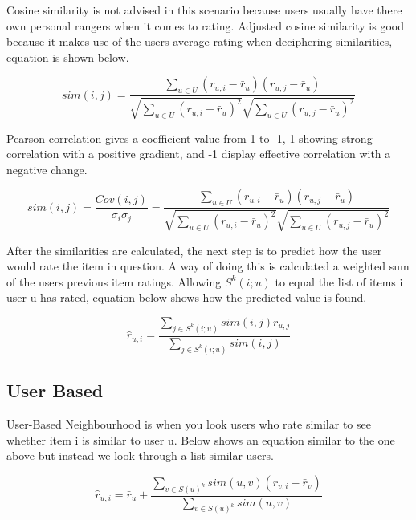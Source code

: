 Cosine similarity is not advised in this scenario because users usually have there own personal rangers when it comes to rating. Adjusted cosine similarity is good because it makes use of the users average rating when deciphering similarities, equation is shown below.

\begin{equation}
	sim(i , j) = \frac{ \sum_{ u \in U } ( r _{ u, i } - \bar{r} _{u} ) ( r _{ u, j} - \bar{r} _{u} ) } { \sqrt{\sum_{ u \in U } ( r _{ u, i } - \bar{r} _{u} )^2} \sqrt{\sum_{ u \in U } ( r _{ u, j } - \bar{r} _{u} )^2}}
\end{equation}

Pearson correlation gives a coefficient value from 1 to -1, 1 showing strong correlation with a positive gradient, and -1 display effective correlation with a negative change.

\begin{equation}
	sim(i , j) = \frac{ Cov( i, j) }{ \sigma _{i} \sigma _{j} } = \frac{ \sum _{ u \in U} ( r _{ u, i } - \bar{r} _{u} ) ( r _{ u, j} - \bar{r} _{u} ) } { \sqrt{\sum_{ u \in U } ( r _{ u, i } - \bar{r} _{u} )^2} \sqrt{\sum_{ u \in U } ( r _{ u, j } - \bar{r} _{u} )^2}}
\end{equation}

After the similarities are calculated, the next step is to predict how the user would rate the item in question. A way of doing this is calculated a weighted sum of the users previous item ratings. Allowing $ S^{k}(i;u)$ to equal the list of items i user u has rated, equation below shows how the predicted value is found.

\begin{equation}
	\hat{r} _{u,i} = \frac{ \sum _{ j \in S^{k}(i;u)} sim(i , j) r _{u, j}}{\sum _{j \in S^{k}(i;u)} sim(i , j)}
\end{equation}




\subsection{User Based}

User-Based Neighbourhood is when you look users who rate similar to see whether item i is similar to user u. Below shows an equation similar to the one above but instead we look through a list similar users.

\begin{equation}
	\hat{r} _{u,i} = \bar{r}_{u} + \frac{ \sum _{v \in S(u)^{k}} sim(u ,v) ( r_{v, i} - \bar{r}_{v})}{\sum _{v \in S(u)^{k}} sim(u , v)}
\end{equation}

